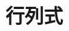 \documentclass[../../topic_linear-algebra]{subfiles}
\begin{document}
\chapter{行列式}


\end{document}
